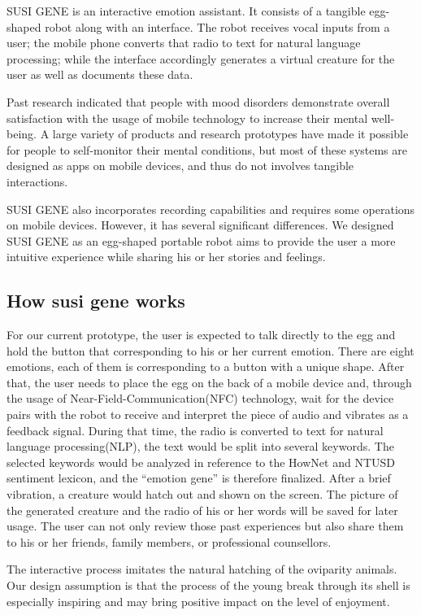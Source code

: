 \documentclass[manuscript,screen]{acmart}
\begin{document}
SUSI GENE is an interactive emotion assistant.  It consists of a tangible egg-shaped robot along with an interface. The robot receives vocal inputs from a user; the mobile phone converts that radio to text for natural language processing; while the interface accordingly generates a virtual creature for the user as well as documents these data.

Past research indicated that people with mood disorders demonstrate overall satisfaction with the usage of mobile technology to increase their mental well-being.\cite{proudfoot2010community}
A large variety of products and research prototypes have made it possible for people to self-monitor their mental conditions, but most of these systems are designed as apps on mobile devices, and thus do not involves tangible interactions.

SUSI GENE also incorporates recording capabilities and requires some operations on mobile devices. However, it has several significant differences. We designed SUSI GENE as an egg-shaped portable robot aims to provide the user a more intuitive experience while sharing his or her stories and feelings. 

\subsection{How susi gene works}

For our current prototype, the user is expected to talk directly to the egg and hold the button that corresponding to his or her current emotion. There are eight emotions, each of them is corresponding to a button with a unique shape. After that, the user needs to place the egg on the back of a mobile device and, through the usage of Near-Field-Communication(NFC) technology, wait for the device pairs with the robot to receive and interpret the piece of audio and vibrates as a feedback signal. During that time, the radio is converted to text for natural language processing(NLP), the text would be split into several keywords. The selected keywords would be analyzed in reference to the HowNet and NTUSD sentiment lexicon, and the “emotion gene” is therefore finalized. After a brief vibration, a creature would hatch out and shown on the screen. The picture of the generated creature and the radio of his or her words will be saved for later usage. The user can not only review those past experiences but also share them to his or her friends, family members, or professional counsellors.

The interactive process imitates the natural hatching of the oviparity animals. Our design assumption is that the process of the young break through its shell is especially inspiring and may bring positive impact on the level of enjoyment.\cite{nezlek2008regulating}
\end{document}
